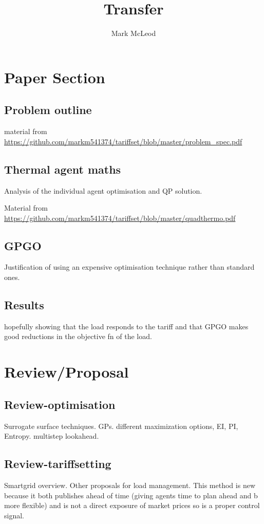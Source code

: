 \documentclass[11pt]{article}
\title{\textbf{Transfer}}
\author{Mark McLeod}
\date{}
\begin{document}
\maketitle

\section{Paper Section}
\subsection{Problem outline}
material from \url{https://github.com/markm541374/tariffset/blob/master/problem_spec.pdf}
\subsection{Thermal agent maths}
Analysis of the individual agent optimisation and QP solution.

Material from \url{https://github.com/markm541374/tariffset/blob/master/quadthermo.pdf}
\subsection{GPGO}
Justification of using an expensive optimisation technique rather than standard ones.
\subsection{Results}
hopefully showing that the load responds to the tariff and that GPGO makes good reductions in the objective fn of the load.

\section{Review/Proposal}

\subsection{Review-optimisation}
Surrogate surface techniques. GPs. different maximization options, EI, PI, Entropy. multistep lookahead.
\subsection{Review-tariffsetting}
Smartgrid overview. Other proposals for load management. This method is new because it both publishes ahead of time (giving agents time to plan ahead and b more flexible) and is not a direct exposure of market prices so is a proper control signal.
\end{document}
